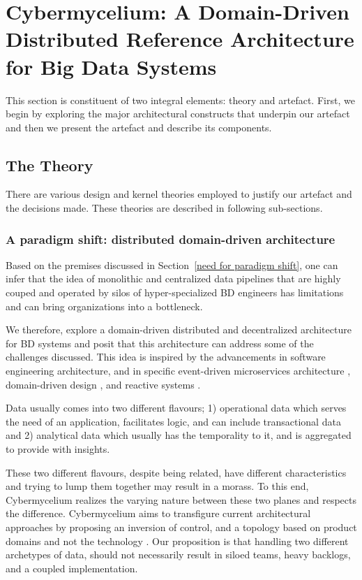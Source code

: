 \documentclass[review]{elsarticle}
\begin{document}
\section{Cybermycelium: A Domain-Driven Distributed Reference Architecture for Big Data Systems} \label{artifact-section}

This section is constituent of two integral elements: theory and artefact. First, we begin by exploring the major architectural constructs that underpin our artefact and then we present the artefact and describe its components.

\subsection{The Theory}

There are various design and kernel theories employed to justify our artefact and the decisions made. These theories are described in following sub-sections.

\subsubsection{A paradigm shift: distributed domain-driven architecture}

Based on the premises discussed in Section~\ref{need for paradigm shift}, one can infer that the idea of monolithic and centralized data pipelines that are highly couped and operated by silos of hyper-specialized BD engineers has limitations and can bring organizations into a bottleneck.

We therefore, explore a domain-driven distributed and decentralized architecture for BD systems and posit that this architecture can address some of the challenges discussed. This idea is inspired by the advancements in software engineering architecture, and in specific event-driven microservices architecture \cite{EventDrivenMicroServices}, domain-driven design \cite{evans2004domain}, and reactive systems \cite{aceto2007reactive}.

Data usually comes into two different flavours; 1) operational data which serves the need of an application, facilitates logic, and can include transactional data and 2) analytical data which usually has the temporality to it, and is aggregated to provide with insights.

These two different flavours, despite being related, have different characteristics and trying to lump them together may result in a morass. To this end, Cybermycelium realizes the varying nature between these two planes and respects the difference. Cybermycelium aims to transfigure current architectural approaches by proposing an inversion of control, and a topology based on product domains and not the technology \cite{dataMeshArticle}. Our proposition is that handling two different archetypes of data, should not necessarily result in siloed teams, heavy backlogs, and a coupled implementation.
\end{document}
